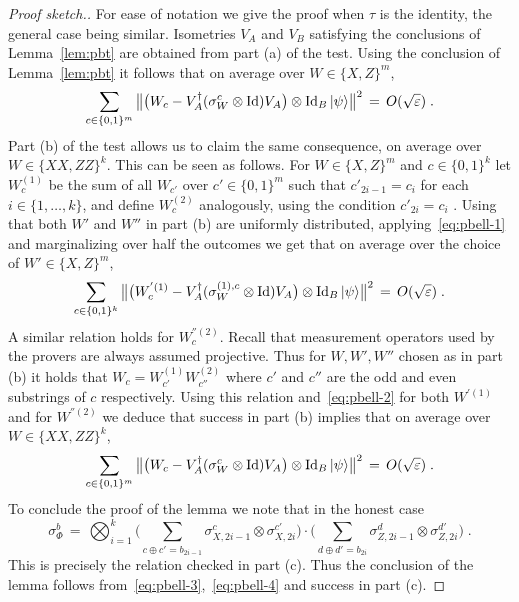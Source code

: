 \begin{proof}[Proof sketch.]
For ease of notation we give the proof when $\tau$ is the identity, the general case being similar. 
Isometries $V_A$ and $V_B$ satisfying the conclusions of 
Lemma~\ref{lem:pbt} are obtained from part (a) of the test. Using the conclusion of Lemma~\ref{lem:pbt} it follows that on average over $W\in\{X,Z\}^m$, 
\begin{equation}\label{eq:pbell-1}
 \sum_{c\in\{0,1\}^m} \big\| \big(W_c -V_A^\dagger (\sigma_W^c \otimes \mathop{\rm Id}\nolimits) V_A\big) \otimes \mathop{\rm Id}\nolimits_B |\psi\rangle \big\|^2 \,=\, O(\sqrt{\varepsilon})\;.
\end{equation}
Part (b) of the test allows us to claim the same consequence, on average over $W\in\{XX,ZZ\}^k$. This can be seen as follows. For $W\in\{X,Z\}^m$ and $c\in\{0,1\}^k$ let $W^{(1)}_c$ be the sum of all $W_{c'}$ over $c'\in\{0,1\}^m$ such that $c'_{2i-1}=c_i$ for each $i\in \{1,\ldots,k\}$, and define $W^{(2)}_c$ analogously, using the condition $c'_{2i}=c_i$ . Using that both $W'$ and $W''$ in part (b) are uniformly distributed, applying~\eqref{eq:pbell-1} and marginalizing over half the outcomes we get that on average over the choice of $W'\in\{X,Z\}^m $,
\begin{equation}\label{eq:pbell-2}
 \sum_{c\in\{0,1\}^k} \big\| \big(W^{'(1)}_c -V_A^\dagger (\sigma_W^{(1),c} \otimes \mathop{\rm Id}\nolimits) V_A\big) \otimes \mathop{\rm Id}\nolimits_B |\psi\rangle \big\|^2 \,=\, O(\sqrt{\varepsilon})\;.
\end{equation}
A similar relation holds for $W^{''(2)}_c$. Recall that measurement operators used by the provers are always assumed projective. Thus for $W,W',W''$ chosen as in part (b) it holds that $W_c = W^{(1)}_{c'} W^{(2)}_{c''}$ where $c'$ and $c''$ are the odd and even substrings of $c$ respectively. Using this relation and~\eqref{eq:pbell-2} for both $W^{'(1)}$ and for $W^{''(2)}$ we deduce that success in part (b) implies that on average over $W\in\{XX,ZZ\}^k$,
\begin{equation}\label{eq:pbell-3}
 \sum_{c\in\{0,1\}^m} \big\| \big(W_c -V_A^\dagger (\sigma_W^{c }\otimes \mathop{\rm Id}\nolimits) V_A\big) \otimes \mathop{\rm Id}\nolimits_B |\psi\rangle \big\|^2 \,=\, O(\sqrt{\varepsilon})\;.
\end{equation}
To conclude the proof of the lemma we note that in the honest case
\begin{equation}\label{eq:pbell-4}
 \sigma_{\Phi}^b \,=\, \bigotimes_{i=1}^k \Big( \sum_{c\oplus c' = b_{2i-1}} \sigma_{X,2i-1}^{c}\otimes \sigma_{X,2i}^{c'}\Big)\cdot\Big(\sum_{d\oplus d' = b_{2i} }\sigma_{Z,2i-1}^{d}\otimes \sigma_{Z,2i}^{d'}\Big)\;.
\end{equation}
This is precisely the relation checked in part (c). Thus the conclusion of the lemma follows from~\eqref{eq:pbell-3},~\eqref{eq:pbell-4} and success in part (c).  
\end{proof}



